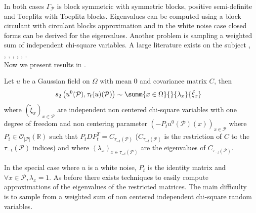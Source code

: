 In both cases $\Gamma_{\mathcal{P}}$ is block symmetric with symmetric blocks, positive semi-definite and Toeplitz with Toeplitz blocks. Eigenvalues can be computed using a block circulant with circulant blocks approximation and in the white noise case closed forms can be derived for the eigenvalues. Another problem is sampling a weighted sum of independent chi-square variables. A large literature exists on the subject \cite{wood1989f}, \cite{moschopoulos1984distribution}, \cite{box1954some}, \cite{imhof1961computing}, \cite{jensen1972gaussian}, \cite{kotz1967series}, \cite{bodenham2016comparison}.\\
Now we present results in \templatematching .
\begin{prop}
  Let $u$ be a Gaussian field on $\Omega$ with mean $0$ and covariance matrix
  $C$, then
  \[s_2\left(u^0(\mathcal{P}), \tau_t(u)(\mathcal{P}) \right) \sim \summ{x \in
      \Omega}{}{\lambda_x}{\tilde{\xi}_x}\] where
  $\left( \tilde{\xi}_x\right)_{x\in \mathcal{P}}$ are independent non centered
  chi-square variables with one degree of freedom and non centering parameter
  $\left(-P_t u^0(\mathcal{P}) (x) \right)_{x \in \mathcal{P}}$ where
  $P_t \in \mathcal{O}_{\vert \mathcal{P} \vert}\left( \mathbb{R} \right)$ such
  that $P_t D P_t^T = C_{\tau_{-t}\left(\mathcal{P}\right)}$
  ($C_{\tau_{-t}\left(\mathcal{P}\right)}$ is the restriction of $C$ to the
  $\tau_{-t}\left(\mathcal{P}\right)$ indices) and where
  $(\lambda_x)_{x\in\tau_{-t}\left(\mathcal{P}\right)}$ are the eigenvalues of
  $C_{\tau_{-t}\left(\mathcal{P}\right)}$.
  \label{s2template}
\end{prop}
In the special case where $u$ is a white noise, $P_t$ is the identity matrix and ${\forall x \in \mathcal{P}, \lambda_x = 1}$. As before there exists techniques to easily compute approximations of the eigenvalues of the restricted matrices. The main difficulty is to sample from a weighted sum of non centered independent chi-square random variables.\\

